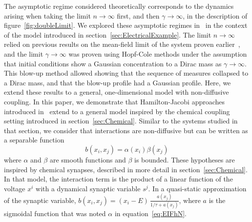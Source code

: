 \documentclass[onefignum,onetabnum]{siamart190516}
\newcommand{\1}{\mathbbm{1}}
\newcommand{\review}[1]{\textcolor{midblue}{ #1}}
\renewcommand{\review}[1]{{ #1}}
\begin{document}
\review{The asymptotic regime considered theoretically corresponds to the dynamics arising when taking the limit $n\to\infty$ first, and then $\gamma \to \infty$, in the description of figure~\ref{fig:doubleLimit}. We explored these asymptotic regimes in~\cite{quininao2020clamping} in the context of the model introduced in section~\ref{sec:ElectricalExample}. The limit $n\to\infty$ relied on previous results on the mean-field limit of the system proven earlier~\cite{mischler2015kinetic}, and the limit $\gamma\to\infty$ was proven using Hopf-Cole methods under the assumption that initial conditions show a Gaussian concentration to a Dirac mass as $\gamma\to\infty$. This blow-up method allowed showing that the sequence of measures collapsed to a Dirac mass, and that the blow-up profile had a Gaussian profile. }
%
\review{Here, we extend these results to a general, one-dimensional model with non-diffusive coupling. In this paper, we demonstrate that Hamilton-Jacobi approaches introduced in~\cite{quininao2020clamping} extend to a general model inspired by the chemical coupling setting introduced in section~\ref{sec:Chemical}. Similar to the systems studied in that section, we consider that interactions are non-diffusive but can be written as a separable function 
\[b(x_i,x_j)=\alpha(x_i)\beta(x_j)\] 
where $\alpha$ and $\beta$ are smooth functions and $\beta$ is bounded. \review{These hypotheses are inspired by chemical synapses, described in more detail in section~\ref{sec:Chemical}. In that model, the interaction term is the product of a linear function of the voltage $x^i$ with a dynamical synaptic variable $s^j$. In a quasi-static approximation of the synaptic variable,  $b(x_i,x_j)=(x_i-E)\,\frac{a(x_j)}{1/\tau+a(x_j)}$, where $a$ is the sigmoidal function that was noted $\alpha$ in equation~\eqref{eq:EIFhN}. }}
\end{document}

